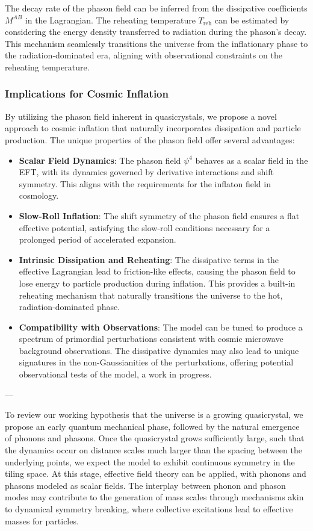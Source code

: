 \documentclass[sn-mathphys-num]{sn-jnl}%
\begin{document}
The decay rate of the phason field can be inferred from the dissipative coefficients $M^{AB}$ in the Lagrangian. The reheating temperature $T_{\text{reh}}$ can be estimated by considering the energy density transferred to radiation during the phason's decay. This mechanism seamlessly transitions the universe from the inflationary phase to the radiation-dominated era, aligning with observational constraints on the reheating temperature.

\subsubsection{Implications for Cosmic Inflation}

By utilizing the phason field inherent in quasicrystals, we propose a novel approach to cosmic inflation that naturally incorporates dissipation and particle production. The unique properties of the phason field offer several advantages:

\begin{itemize} \item \textbf{Scalar Field Dynamics}: The phason field $\psi^4$ behaves as a scalar field in the EFT, with its dynamics governed by derivative interactions and shift symmetry. This aligns with the requirements for the inflaton field in cosmology. \item \textbf{Slow-Roll Inflation}: The shift symmetry of the phason field ensures a flat effective potential, satisfying the slow-roll conditions necessary for a prolonged period of accelerated expansion. \item \textbf{Intrinsic Dissipation and Reheating}: The dissipative terms in the effective Lagrangian lead to friction-like effects, causing the phason field to lose energy to particle production during inflation. This provides a built-in reheating mechanism that naturally transitions the universe to the hot, radiation-dominated phase. \item \textbf{Compatibility with Observations}: The model can be tuned to produce a spectrum of primordial perturbations consistent with cosmic microwave background observations. The dissipative dynamics may also lead to unique signatures in the non-Gaussianities of the perturbations, offering potential observational tests of the model, a work in progress. \end{itemize}
---

To review our working hypothesis that the universe is a growing quasicrystal, we propose an early quantum mechanical phase,  
followed by the natural emergence of phonons and phasons. Once the quasicrystal grows sufficiently large, such that the dynamics occur on distance scales much larger than the spacing between the underlying points, we expect the model to exhibit continuous symmetry in the tiling space. At this stage, effective field theory can be applied, with phonons and phasons modeled as scalar fields. The interplay between phonon and phason modes may contribute to the generation of mass scales through mechanisms akin to dynamical symmetry breaking, where collective excitations lead to effective masses for particles.
\end{document}
